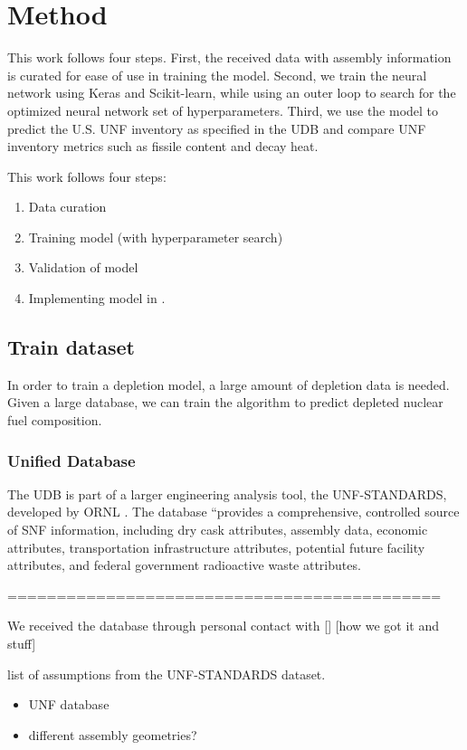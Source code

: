 \section{Method}

This work follows four steps. First, the
received data with assembly information is
curated for ease of use in training the model.
Second, we train the neural network using Keras and
Scikit-learn, while using an outer loop to
search for the optimized neural network set of hyperparameters.
Third, we use the model to predict the U.S. \gls{UNF}
inventory as specified in the \gls{UDB} and compare
\gls{UNF} inventory metrics such as fissile content
and decay heat.


This work follows four steps:
\begin{enumerate}
\item Data curation
\item Training model (with hyperparameter search)
\item Validation of model
\item Implementing model in \Cyclus.
\end{enumerate}

\subsection{Train dataset}

In order to train a depletion model, a large amount of
depletion data is needed. Given a large database,
we can train the algorithm to predict depleted
nuclear fuel composition.

\subsubsection{Unified Database}
The \gls{UDB} is part of a larger engineering
analysis tool, the \gls{UNF-STANDARDS}, developed
by \gls{ORNL} \cite{peterson_used_2013}. The
database ``provides a comprehensive, controlled
source of \gls{SNF} information, including
dry cask attributes, assembly data, economic attributes,
transportation infrastructure attributes, potential future
facility attributes, and federal government radioactive
waste attributes.

============================================

We received the database through personal contact
with [] [how we got it and stuff]

list of assumptions from the \gls{UNF-STANDARDS} dataset.
\begin{itemize}
    \item UNF database
    \item different assembly geometries?
\end{itemize}

